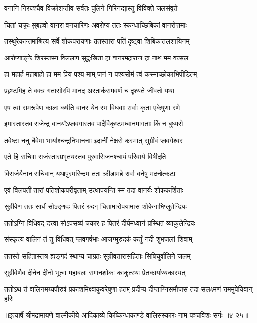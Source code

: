 \twolineshloka
{वनानि गिरयश्चैव विक्रोशन्तीव सर्वतः}
{पुलिने गिरिनद्यास्तु विविक्ते जलसंवृते} %

\twolineshloka
{चितां चक्रुः सुबहवो वानरा वनचारिणः}
{अवरोप्य ततः स्कन्धाच्छिबिकां वानरोत्तमाः} %

\twolineshloka
{तस्थुरेकान्तमाश्रित्य सर्वे शोकपरायणाः}
{ततस्तारा पतिं दृष्ट्वा शिबिकातलशायिनम्} %

\twolineshloka
{आरोप्याङ्के शिरस्तस्य विललाप सुदुःखिता}
{हा वानरमहाराज हा नाथ मम वत्सल} %

\twolineshloka
{हा महार्ह महाबाहो हा मम प्रिय पश्य माम्}
{जनं न पश्यसीमं त्वं कस्माच्छोकाभिपीडितम्} %

\twolineshloka
{प्रहृष्टमिह ते वक्त्रं गतासोरपि मानद}
{अस्तार्कसमवर्णं च दृश्यते जीवतो यथा} %

\twolineshloka
{एष त्वां रामरूपेण कालः कर्षति वानर}
{येन स्म विधवाः सर्वाः कृता एकेषुणा रणे} %

\twolineshloka
{इमास्तास्तव राजेन्द्र वानर्योऽप्लवगास्तव}
{पादैर्विकृष्टमध्वानमागताः किं न बुध्यसे} %

\twolineshloka
{तवेष्टा ननु चैवेमा भार्याश्चन्द्रनिभाननाः}
{इदानीं नेक्षसे कस्मात् सुग्रीवं प्लवगेश्वर} %

\twolineshloka
{एते हि सचिवा राजंस्तारप्रभृतयस्तव}
{पुरवासिजनश्चायं परिवार्य विषीदति} %

\twolineshloka
{विसर्जयैनान् सचिवान् यथापुरमरिन्दम}
{ततः क्रीडामहे सर्वा वनेषु मदनोत्कटाः} %

\twolineshloka
{एवं विलपतीं तारां पतिशोकपरीवृताम्}
{उत्थापयन्ति स्म तदा वानर्यः शोककर्शिताः} %

\twolineshloka
{सुग्रीवेण ततः सार्धं सोऽङ्गदः पितरं रुदन्}
{चितामारोपयामास शोकेनाभिप्लुतेन्द्रियः} %

\twolineshloka
{ततोऽग्निं विधिवद् दत्त्वा सोऽपसव्यं चकार ह}
{पितरं दीर्घमध्वानं प्रस्थितं व्याकुलेन्द्रियः} %

\twolineshloka
{संस्कृत्य वालिनं तं तु विधिवत् प्लवगर्षभाः}
{आजग्मुरुदकं कर्तुं नदीं शुभजलां शिवाम्} %

\twolineshloka
{ततस्ते सहितास्तत्र ह्यङ्गदं स्थाप्य चाग्रतः}
{सुग्रीवतारासहिताः सिषिचुर्वालिने जलम्} %

\twolineshloka
{सुग्रीवेणैव दीनेन दीनो भूत्वा महाबलः}
{समानशोकः काकुत्स्थः प्रेतकार्याण्यकारयत्} %

\twolineshloka
{ततोऽथ तं वालिनमग्र्यपौरुषं प्रकाशमिक्ष्वाकुवरेषुणा हतम्}
{प्रदीप्य दीप्ताग्निसमौजसं तदा सलक्ष्मणं राममुपेयिवान् हरिः} %


॥इत्यार्षे श्रीमद्रामायणे वाल्मीकीये आदिकाव्ये किष्किन्धाकाण्डे वालिसंस्कारः नाम पञ्चविंशः सर्गः ॥४-२५॥
